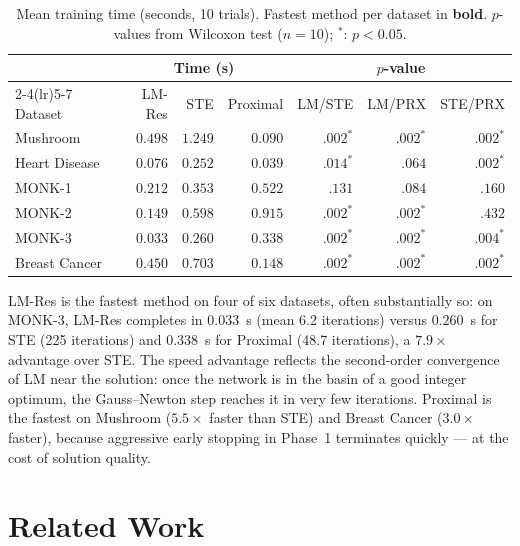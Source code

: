 \documentclass[12pt,a4paper]{article}
\begin{document}
\begin{table}[h]
\centering
\caption{Mean training time (seconds, 10 trials).
Fastest method per dataset in \textbf{bold}.
$p$-values from Wilcoxon test ($n = 10$); $^{\ast}$: $p < 0.05$.}
\label{tab:time}
\setlength{\tabcolsep}{4pt}
\begin{tabular}{l rrr rrr}
\toprule
 & \multicolumn{3}{c}{Time (s)} & \multicolumn{3}{c}{$p$-value} \\
\cmidrule(lr){2-4}\cmidrule(lr){5-7}
Dataset & LM-Res & STE & Proximal & LM/STE & LM/PRX & STE/PRX \\
\midrule
Mushroom       & $0.498$ & $1.249$ & $\mathbf{0.090}$
               & $.002^{\ast}$ & $.002^{\ast}$ & $.002^{\ast}$ \\
Heart Disease  & $\mathbf{0.076}$ & $0.252$ & $0.039$
               & $.014^{\ast}$ & $.064$ & $.002^{\ast}$ \\
MONK-1         & $\mathbf{0.212}$ & $0.353$ & $0.522$
               & $.131$ & $.084$ & $.160$ \\
MONK-2         & $\mathbf{0.149}$ & $0.598$ & $0.915$
               & $.002^{\ast}$ & $.002^{\ast}$ & $.432$ \\
MONK-3         & $\mathbf{0.033}$ & $0.260$ & $0.338$
               & $.002^{\ast}$ & $.002^{\ast}$ & $.004^{\ast}$ \\
Breast Cancer  & $0.450$ & $0.703$ & $\mathbf{0.148}$
               & $.002^{\ast}$ & $.002^{\ast}$ & $.002^{\ast}$ \\
\bottomrule
\end{tabular}
\end{table}

LM-Res is the fastest method on four of six datasets, often substantially so:
on MONK-3, LM-Res completes in $0.033$~s (mean 6.2 iterations) versus
$0.260$~s for STE (225 iterations) and $0.338$~s for Proximal
(48.7 iterations), a $7.9\times$ advantage over STE.
The speed advantage reflects the second-order convergence of LM near the
solution: once the network is in the basin of a good integer optimum, the
Gauss--Newton step reaches it in very few iterations.
Proximal is the fastest on Mushroom ($5.5\times$ faster than STE) and Breast
Cancer ($3.0\times$ faster), because aggressive early stopping in Phase~1
terminates quickly --- at the cost of solution quality.

\section{Related Work}
\label{sec:related}
\end{document}
